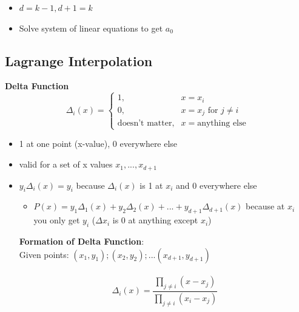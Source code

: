 \documentclass{article}\usepackage{amsmath,amssymb,amsthm,tikz,tkz-graph,color,chngpage,soul,hyperref,csquotes,graphicx,floatrow}\newcommand*{\QEDB}{\hfill\ensuremath{\square}}\newtheorem*{prop}{Proposition}\renewcommand{\theenumi}{\alph{enumi}}\usepackage[shortlabels]{enumitem}\usepackage[nobreak=true]{mdframed}\usetikzlibrary{matrix,calc}\MakeOuterQuote{"}\usepackage[margin=0.75in]{geometry} \newtheorem{theorem}{Theorem}
\begin{document}
\begin{itemize}
    \item $d = k-1, d+1 = k$
    \item Solve system of linear equations to get $a_0$
\end{itemize}

\subsection*{Lagrange Interpolation}
\textbf{Delta Function}
$$
\Delta_i(x) =
\begin{cases}
1, & x =x_i \\
0, & x =x_j \text{ for } j\ne i \\
\text{doesn't matter}, & x = \text{anything else}
\end{cases}
$$
\begin{itemize}
\item 1 at one point (x-value), 0 everywhere else
\item valid for a set of x values $x_1, ..., x_{d+1}$
\item $y_i\Delta_i(x) = y_i$ because $\Delta_i(x)$ is 1 at $x_i$ and 0 everywhere else
	\begin{itemize}[label=$\star$]
	\item $P(x) = y_1\Delta_1(x) + y_2\Delta_2(x) + ... + y_{d+1}\Delta_{d+1}(x)$ because at $x_i$ you only get $y_i$ ($\Delta{x_i}$ is 0 at anything except $x_i$)
    \end{itemize}
\begin{mdframed}
\textbf{Formation of Delta Function}:\\
Given points: $(x_1, y_1); (x_2, y_2); ... (x_{d+1}, y_{d+1})$\\\\
\begin{equation}\Delta_i(x) = \frac{\prod_{j\ne i}(x-x_j)}{\prod_{j\ne i}(x_i-x_j)}\end{equation}
\end{mdframed}
\end{itemize}
\end{document}
